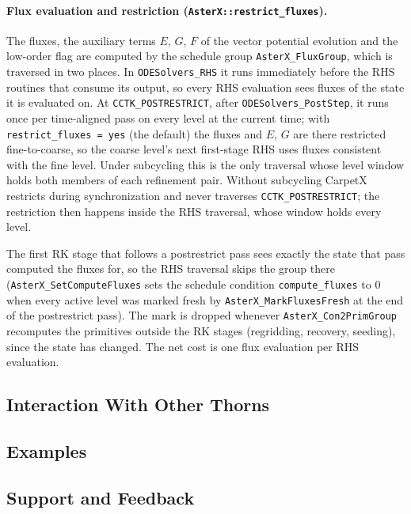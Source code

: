 \paragraph{Flux evaluation and restriction (\texttt{AsterX::restrict\_fluxes}).}
The fluxes, the auxiliary terms $E$, $G$, $F$ of the vector potential
evolution and the low-order flag are computed by the schedule group
\texttt{AsterX\_FluxGroup}, which is traversed in two places. In
\texttt{ODESolvers\_RHS} it runs immediately before the RHS routines that
consume its output, so every RHS evaluation sees fluxes of the state it is
evaluated on. At \texttt{CCTK\_POSTRESTRICT}, after
\texttt{ODESolvers\_PostStep}, it runs once per time-aligned pass on every
level at the current time; with \texttt{restrict\_fluxes = yes} (the default)
the fluxes and $E$, $G$ are there restricted fine-to-coarse, so the coarse
level's next first-stage RHS uses fluxes consistent with the fine level.
Under subcycling this is the only traversal whose level window holds both
members of each refinement pair. Without subcycling CarpetX restricts during
synchronization and never traverses \texttt{CCTK\_POSTRESTRICT}; the
restriction then happens inside the RHS traversal, whose window holds every
level.

The first RK stage that follows a postrestrict pass sees exactly the state that
pass computed the fluxes for, so the RHS traversal skips the group there
(\texttt{AsterX\_SetComputeFluxes} sets the schedule condition
\texttt{compute\_fluxes} to 0 when every active level was marked fresh by
\texttt{AsterX\_MarkFluxesFresh} at the end of the postrestrict pass). The
mark is dropped whenever \texttt{AsterX\_Con2PrimGroup} recomputes the
primitives outside the RK stages (regridding, recovery, seeding), since the
state has changed. The net cost is one flux evaluation per RHS evaluation.

\subsection{Interaction With Other Thorns}

\subsection{Examples}

\subsection{Support and Feedback}


